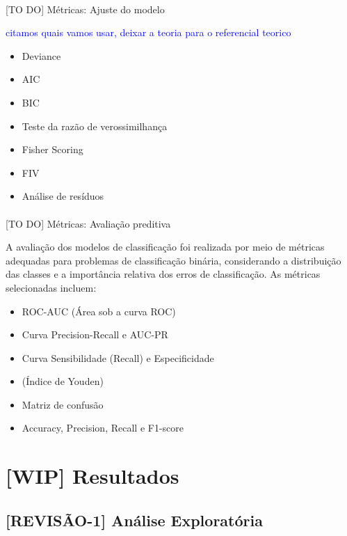 \documentclass[
  brazilian,
  12pt,
  letterpaper,
  DIV=11,
  numbers=noendperiod]{scrartcl}
\makeatletter
\let\oldparagraph\paragraph
\renewcommand{\paragraph}{
    \@ifstar
      \xxxParagraphStar
      \xxxParagraphNoStar
  }
\newcommand{\xxxParagraphStar}[1]{\oldparagraph*{#1}\mbox{}}
\newcommand{\xxxParagraphNoStar}[1]{\oldparagraph{#1}\mbox{}}
\providecommand{\tightlist}{%
  \setlength{\itemsep}{0pt}\setlength{\parskip}{0pt}}
\newcommand{\blue}[1]{\textcolor{blue}{#1}}
\makeatother
\begin{document}
\paragraph{{[}TO DO{]} Métricas: Ajuste do
modelo}\label{to-do-muxe9tricas-ajuste-do-modelo}

\blue{citamos quais vamos usar, deixar a teoria para o referencial teorico}

\begin{itemize}
\tightlist
\item
  Deviance
\item
  AIC
\item
  BIC
\item
  Teste da razão de verossimilhança
\item
  Fisher Scoring
\item
  FIV
\item
  Análise de resíduos
\end{itemize}

\paragraph{{[}TO DO{]} Métricas: Avaliação
preditiva}\label{to-do-muxe9tricas-avaliauxe7uxe3o-preditiva}

A avaliação dos modelos de classificação foi realizada por meio de
métricas adequadas para problemas de classificação binária, considerando
a distribuição das classes e a importância relativa dos erros de
classificação. As métricas selecionadas incluem:

\begin{itemize}
\tightlist
\item
  ROC-AUC (Área sob a curva ROC)
\item
  Curva Precision-Recall e AUC-PR
\item
  Curva Sensibilidade (Recall) e Especificidade
\item
  (Índice de Youden)
\item
  Matriz de confusão
\item
  Accuracy, Precision, Recall e F1-score
\end{itemize}

\section{{[}WIP{]} Resultados}\label{wip-resultados}

\subsection{{[}REVISÃO-1{]} Análise
Exploratória}\label{revisuxe3o-1-anuxe1lise-exploratuxf3ria}
\end{document}
